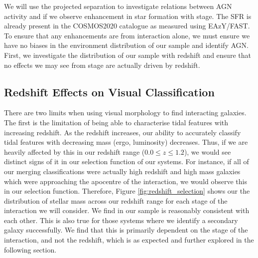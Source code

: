 We will use the projected separation to investigate relations between AGN activity and if we observe enhancement in star formation with stage. The SFR is already present in the COSMOS2020 catalogue as measured using EAzY/FAST. To ensure that any enhancements are from interaction alone, we must ensure we have no biases in the environment distribution of our sample and identify AGN. First, we investigate the distribution of our sample with redshift and ensure that no effects we may see from stage are actually driven by redshift.

\subsection{Redshift Effects on Visual Classification}
\noindent There are two limits when using visual morphology to find interacting galaxies. The first is the limitation of being able to characterise tidal features with increasing redshift. As the redshift increases, our ability to accurately classify tidal features with decreasing mass (ergo, luminosity) decreases. Thus, if we are heavily affected by this in our redshift range ($0.0 \leq z \leq 1.2$), we would see distinct signs of it in our selection function of our systems. For instance, if all of our merging classifications were actually high redshift and high mass galaxies which were approaching the apocentre of the interaction, we would observe this in our selection function. Therefore, Figure \ref{fig:redshift_selection} shows our the distribution of stellar mass across our redshift range for each stage of the interaction we will consider. We find in our sample is reasonably consistent with each other. This is also true for those systems where we identify a secondary galaxy successfully. We find that this is primarily dependent on the stage of the interaction, and not the redshift, which is as expected and further explored in the following section.

